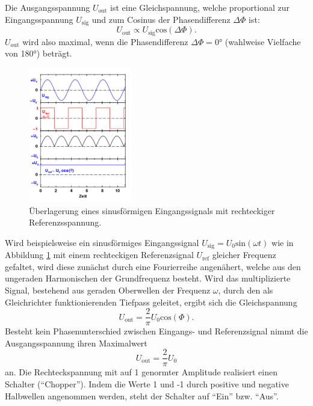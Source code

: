 Die Ausgangsspannung $U_\mathup{out}$ ist eine Gleichspannung, welche proportional zur Eingangsspannung $U_\mathup{sig}$ und zum Cosinus der Phasendifferenz $\Delta\Phi$ ist:
\begin{equation}
 	U_\mathup{out}\propto{U_\text{sig}}\text{cos}(\Delta\Phi). 
 	\label{cosinus_ausgangsspannung}
 \end{equation} 
$U_\mathup{out}$ wird also maximal, wenn die Phasendifferenz $\Delta\Phi=0°$ (wahlweise Vielfache von 180°) beträgt. \cite{regensburg}

\begin{figure}
	\centering
		\includegraphics[width=0.4\textwidth]{Bilder/Beispiel.pdf}
		\caption{Überlagerung eines sinusförmigen Eingangssignals mit rechteckiger Referenzsspannung. \cite{V303}}
		\label{fig:bsp}
	\end{figure}
Wird beispielsweise ein sinusförmiges Eingangssignal $U_\mathup{sig}=U_0\text{sin}(\omega t)$ wie in Abbildung \ref{fig:bsp} mit einem rechteckigen Referenzsignal $U_\mathup{ref}$ gleicher Frequenz gefaltet, wird diese zunächst durch eine Fourierreihe angenähert, welche aus den ungeraden Harmonischen der Grundfrequenz besteht. 
Wird das multiplizierte Signal,  bestehend aus geraden Oberwellen der Frequenz $\omega$, durch den als Gleichrichter funktionierenden Tiefpass geleitet, ergibt sich die Gleichspannung
\begin{equation}
	U_\mathup{out}=\frac{2}{\pi}U_0\text{cos}(\Phi).
\end{equation}
Besteht kein Phasenunterschied zwischen Eingangs- und Referenzsignal nimmt die Ausgangsspannung ihren Maximalwert 
\begin{equation}
	U_\mathup{out}=\frac{2}{\pi}U_0
\end{equation}
an.
Die Rechteckspannung mit auf 1 genormter Amplitude realisiert einen Schalter (\enquote{Chopper}). 
Indem die Werte 1 und -1 durch positive und negative Halbwellen angenommen werden, steht der Schalter auf \enquote{Ein} bzw. \enquote{Aus}.



